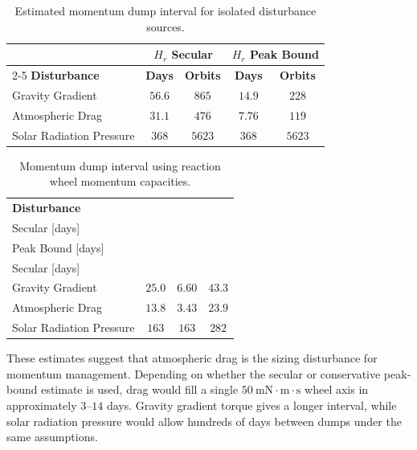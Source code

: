 \begin{table}[H]
    \centering
    \caption{Estimated momentum dump interval for isolated disturbance sources.}
    \label{tab:dump_cadence}
    \begin{tabular}{lcccc}
        \hline
        & \multicolumn{2}{c}{\textbf{$H_r$ Secular}} &
        \multicolumn{2}{c}{\textbf{$H_r$ Peak Bound}} \\
        \cline{2-5}
        \textbf{Disturbance} & \textbf{Days} & \textbf{Orbits} & \textbf{Days} & \textbf{Orbits} \\
        \hline
        Gravity Gradient & $56.6$ & $865$ & $14.9$ & $228$ \\
        Atmospheric Drag & $31.1$ & $476$ & $7.76$ & $119$ \\
        Solar Radiation Pressure & $368$ & $5623$ & $368$ & $5623$ \\
        \hline
    \end{tabular}
\end{table}

\begin{table}[H]
    \centering
    \caption{Momentum dump interval using reaction wheel momentum capacities.}
    \label{tab:wheel_dump_cadence}
    \begin{tabular}{lccc}
        \hline
        \textbf{Disturbance} &
        \textbf{\makecell{$h_{\mathrm{wheel,max}}$\\Secular [days]}} &
        \textbf{\makecell{$h_{\mathrm{wheel,max}}$\\Peak Bound [days]}} &
        \textbf{\makecell{$\sqrt{3}\,h_{\mathrm{wheel,max}}$\\Secular [days]}} \\
        \hline
        Gravity Gradient              & $25.0$ & $6.60$ & $43.3$ \\
        Atmospheric Drag              & $13.8$ & $3.43$ & $23.9$ \\
        Solar Radiation Pressure      & $163$  & $163$  & $282$  \\
        \hline
    \end{tabular}
\end{table}

These estimates suggest that atmospheric drag is the sizing disturbance for momentum
management. Depending on whether the secular or conservative peak-bound estimate is used,
drag would fill a single $50~\mathrm{mN\cdot m\cdot s}$ wheel axis in approximately
$3$--$14$ days. Gravity gradient torque gives a longer interval, while solar radiation
pressure would allow hundreds of days between dumps under the same assumptions.

